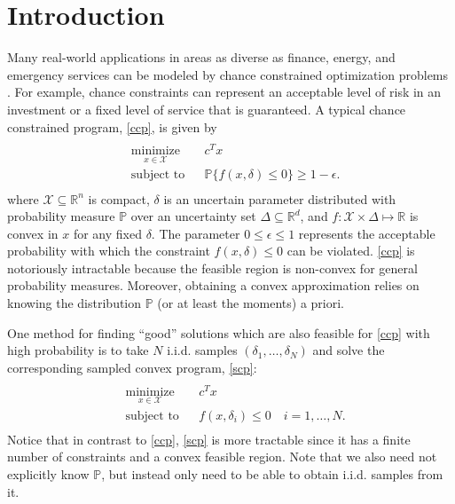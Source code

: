 \documentclass[12pt]{article}
\begin{document}
\section*{Introduction}
Many real-world applications in areas as diverse as finance, energy, and emergency services can be modeled by chance constrained optimization problems \cite{bental09}.
For example, chance constraints can represent an acceptable level of risk in an investment or a fixed level of service that is guaranteed.
A typical chance constrained program, \ref{ccp}, is given by
\begin{align}\label{ccp}
\begin{split}
\begin{aligned}
    & \underset{x \in \mathcal{X}}{\text{minimize}}
    & & c^T x \\
    & \text{subject to}
    & & \mathbb{P}\{f(x,\delta) \leq 0\} \geq 1-\epsilon.
\end{aligned}
\end{split} \tag{CCP$_\epsilon$}
\end{align}
where $\mathcal{X} \subseteq \mathbb{R}^n$ is compact, $\delta$ is an uncertain parameter distributed with probability measure $\mathbb{P}$ over an uncertainty set $\Delta \subseteq \mathbb{R}^d$, and $f:\mathcal{X} \times \Delta \mapsto \mathbb{R}$ is convex in $x$ for any fixed $\delta$.
The parameter $0 \leq \epsilon \leq 1$ represents the acceptable probability with which the constraint $f(x,\delta) \leq 0$ can be violated.
\ref{ccp} is notoriously intractable because the feasible region is non-convex for general probability measures.
Moreover, obtaining a convex approximation relies on knowing the distribution $\mathbb{P}$ (or at least the moments) a priori.

One method for finding ``good'' solutions which are also feasible for \ref{ccp} with high probability is to take $N$ i.i.d. samples $(\delta_1, \ldots, \delta_N)$ and solve the corresponding sampled convex program, \ref{scp}:
\begin{align}\label{scp}
\begin{split}
\begin{aligned}
    & \underset{x \in \mathcal{X}}{\text{minimize}}
    & & c^T x \\
    & \text{subject to}
    & & f(x,\delta_i) \leq 0 \quad i = 1, \ldots, N.
\end{aligned}
\end{split} \tag{SCP$_N$}
\end{align}
Notice that in contrast to \ref{ccp}, \ref{scp} is more tractable since it has a finite number of constraints and a convex feasible region. Note that we also need not explicitly know $\mathbb{P}$, but instead only need to be able to obtain i.i.d. samples from it.
\end{document}
